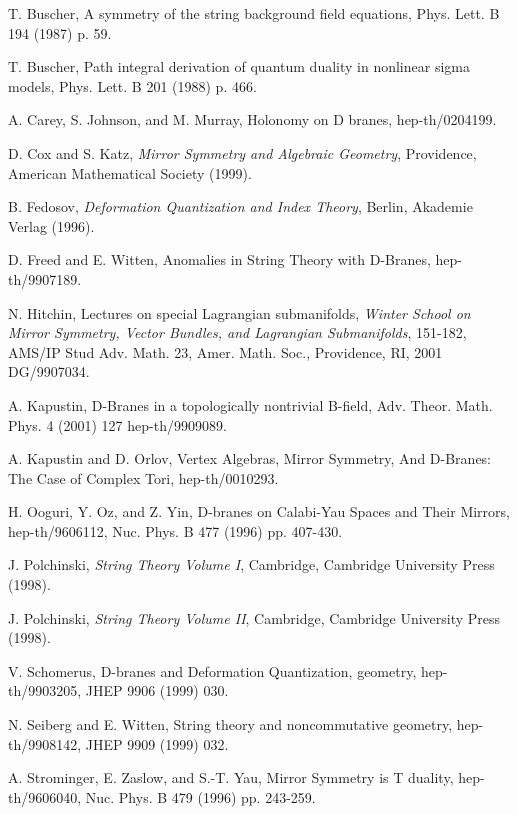 \documentclass[a4paper,11pt]{amsart}
\begin{document}
\begin{thebibliography}{99}


 T. Buscher, A symmetry of the string background field equations, 
Phys. Lett. B 194 (1987) p. 59.

 T. Buscher, Path integral derivation of quantum duality in
nonlinear sigma models, Phys. Lett. B 201 (1988) p. 466.

 A. Carey, S. Johnson, and M. Murray, Holonomy on D branes, 
hep-th/0204199.

 D. Cox and S. Katz, {\em Mirror Symmetry and Algebraic Geometry},
 Providence, American Mathematical Society (1999).

 B. Fedosov, {\em Deformation Quantization and Index Theory},
 Berlin, Akademie Verlag (1996).
 
 D. Freed and E. Witten, Anomalies in String Theory with D-Branes,
 hep-th/9907189.

 N. Hitchin, Lectures on special Lagrangian submanifolds, 
{\em Winter School on Mirror Symmetry, Vector Bundles, and Lagrangian
Submanifolds}, 151-182, AMS/IP Stud Adv. Math. 23, Amer. Math. Soc., Providence,
RI, 2001 DG/9907034.

 A. Kapustin, D-Branes in a topologically nontrivial B-field,
Adv. Theor. Math. Phys. 4 (2001) 127 hep-th/9909089.
   
 A. Kapustin and D. Orlov, Vertex Algebras, Mirror Symmetry, And
D-Branes: The Case of Complex Tori, hep-th/0010293.

 H. Ooguri, Y. Oz, and Z. Yin, D-branes on Calabi-Yau Spaces and
Their Mirrors, hep-th/9606112, Nuc. Phys. B 477 (1996) pp. 407-430.
  
 J. Polchinski, {\em String Theory Volume I},
 Cambridge, Cambridge University Press (1998).

 J. Polchinski, {\em String Theory Volume II},
 Cambridge, Cambridge University Press (1998).
  
 V. Schomerus, D-branes and Deformation Quantization,
geometry, hep-th/9903205, JHEP 9906 (1999) 030.

 N. Seiberg and E. Witten, String theory and noncommutative
geometry, hep-th/9908142, JHEP 9909 (1999) 032.

 A. Strominger, E. Zaslow, and S.-T. Yau, Mirror Symmetry is T
duality, hep-th/9606040, Nuc. Phys. B 479 (1996) pp. 243-259.

\end{thebibliography}

  
\end{document}
